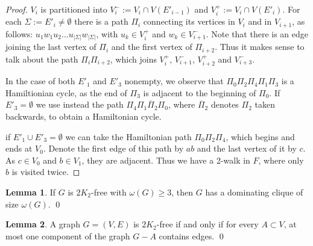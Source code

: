 \documentclass{amsart}
\theoremstyle{definition}
\newtheorem{lemma}{Lemma}
\begin{document}
\begin{proof}
$V_i$ is partitioned into
$V_i^-:= V_i\cap V(E'_{i-1})$ and 
$V_i^+:= V_i\cap V(E'_{i})$. For each $\Sigma:=E'_i\neq\emptyset$ there is
a path $\Pi_i$ connecting its vertices in $V_i$ and in $V_{i+1}$, 
as follows: $u_1 w_1 u_2\dots u_{|\Sigma|}w_{|\Sigma|}$, with 
$u_k\in V_i^+$ and $w_k\in V_{i+1}^-$.%
Note that there is an edge joining the last vertex of $\Pi_i$ and
the first vertex of $\Pi_{i+2}$. Thus it makes sense to talk about the path
$\Pi_i\Pi_{i+2}$, which joins $V_i^+$, $V_{i+1}^-$, $V_{i+2}^+$ and
$V_{i+3}^-$.

In the case of both $E'_1$ and $E'_3$ nonempty, we observe that 
$\Pi_0\Pi_2\Pi_4\Pi_1\Pi_3$ is a Hamiltionian cycle, as the end of
$\Pi_3$ is adjacent to the beginning of $\Pi_0$. 
If $E'_3=\emptyset$  
we use instead the path 
$\Pi_4\Pi_1\overline{\Pi}_2\Pi_0$, where $\overline{\Pi}_2$
denotes $\Pi_2$ taken backwards, to obtain a Hamiltonian
cycle.

if $E'_1\cup E'_3=\emptyset$ 
we can take the Hamiltonian path $\Pi_0\Pi_2\Pi_4$, 
which begins and ends at $V_0$. Denote the first
edge of this path by $ab$ and the last vertex of it 
by $c$. As $c\in V_0$ and $b\in V_1$, they are adjacent.
Thus we have a 2-walk in $F$, where only $b$ is visited
twice.
\end{proof}
\begin{lemma}\label{lm2}{\cite[Theorem 3]{chung1990maximum}}
If $G$ is $2K_2$-free with $\omega(G)\ge3$, then $G$ has a dominating clique of size $\omega(G)$. \qed
\end{lemma}

\begin{lemma}\label{lm3}{\cite[Observation 1]{broersma2014toughness}}
A graph $G=(V,E)$ is $2K_2$-free if and only if for every $A\subset V$, at most one component of the graph $G-A$ contains edges. \qed
\end{lemma}
\end{document}
